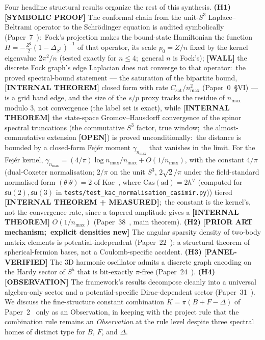 \documentclass[aps,pra,twocolumn,superscriptaddress,longbibliography]{revtex4-2}
\newcommand{\gvq}[2]{#2}
\newcommand{\gvc}[2]{#2}
\begin{document}
Four headline structural results organize the rest of this synthesis.
\textbf{(H1)} \textbf{[SYMBOLIC PROOF]} The conformal chain from the
unit-$S^3$ Laplace--Beltrami operator to the Schr\"odinger equation is
audited symbolically (Paper~7~\cite{loutey_paper7}):\ Fock's projection
makes the bound-state Hamiltonian the function $H = -\tfrac{Z^2}{2}(1-\Delta_{S^3})^{-1}$ of
that operator, its scale $p_0 = Z/n$ fixed by the kernel eigenvalue
$2\pi^2/n$ (tested exactly for $n \le 4$;\ general $n$ is Fock's);
\textbf{[WALL]} \gvc{graph-s3-wall}{the discrete Fock graph's edge Laplacian does not
converge to that operator}:\ the proved spectral-bound statement ---
the saturation of the bipartite bound, \textbf{[INTERNAL THEOREM]}
closed form with rate $C_{\mathrm{sat}}/n_{\max}^2$ (Paper~0~\S VI) --- is a grid band
edge, and the size of the $s/p$ proxy tracks the residue of
$n_{\max}$ modulo $3$, not convergence (the label set is exact), while
\textbf{[INTERNAL THEOREM]} the state-space Gromov--Hausdorff
convergence of the spinor spectral truncations (the commutative $S^3$
factor, true window;\ the almost-commutative extension \textbf{[OPEN]})
is proved unconditionally:\ the distance is bounded by a closed-form Fej\'er
moment $\gamma_{n_{\max}}$ that vanishes in the limit.  \gvc{p38-rate-constant}{For the Fej\'er
kernel,
$\gamma_{n_{\max}} = (4/\pi)\log n_{\max}/n_{\max} + O(1/n_{\max})$, with the constant
$\gvq{l2_rate_4_over_pi}{4/\pi}$ (dual-Coxeter normalisation; $2/\pi$ on the unit $S^3$, $2\sqrt2/\pi$ under the field-standard normalised form $(\theta|\theta) = 2$ of Kac~\cite{kac_infinite1990}, where $\mathrm{Cas}(\mathrm{ad}) = 2h^\vee$ (computed for $\mathfrak{su}(2), \mathfrak{su}(3)$ in \texttt{tests/test\_kac\_normalisation\_casimir.py}))
tiered \textbf{[INTERNAL THEOREM + MEASURED]};\ the constant is the
kernel's, not the convergence rate, since a tapered amplitude gives a \textbf{[INTERNAL THEOREM]} $O(1/n_{\max})$ (Paper~38~\cite{loutey_paper38}, main theorem)}.  \textbf{(H2)} \textbf{[PRIOR ART mechanism;\ explicit densities new]} The angular sparsity
density of two-body matrix elements is potential-independent
(Paper~22~\cite{loutey_paper22}): a structural theorem of
spherical-fermion bases, not a Coulomb-specific accident.
\textbf{(H3)} \textbf{[PANEL-VERIFIED]} The 3D harmonic oscillator admits a discrete graph
encoding on the Hardy sector of $S^5$ that is bit-exactly $\pi$-free
(Paper~24~\cite{loutey_paper24}).  \textbf{(H4)} \textbf{[OBSERVATION]} The framework's
results decompose cleanly into a universal algebra-only sector and a
potential-specific Dirac-dependent sector
(Paper~31~\cite{loutey_paper31}).  \gvc{k-combination-rule}{We discuss the fine-structure
constant combination $K = \pi(B + F - \Delta)$ of
Paper~2~\cite{loutey_paper2_alpha} only as an Observation, in keeping
with the project rule that the combination rule remains an
\emph{Observation} at the rule level despite three spectral homes of
distinct type for $B$, $F$, and $\Delta$}.
\end{document}
